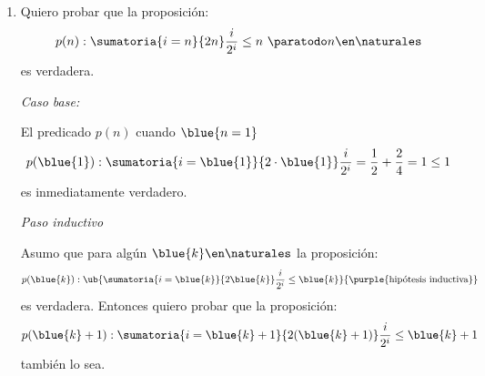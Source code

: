 \begin{enumerate}[label=\magenta{\roman*)}]
        Los terminos de la sumatoria son decrecientes, es decir que \textit{el término más grande de todos es el primero} $\orange{\frac{1}{2}}$,
        cuando $i = 1$, por lo tanto puedo acotar así:
        $$
          \begin{array}{rcl}
            \frac{-2h^2 - 2h + 1}{h + 2} +
            \ob{
              \sumatoria{i=1}{h + 1} \frac{1}{1+i}
            }{
              \leq \orange{\frac{1}{2}} + \cdots + \orange{\frac{1}{2}}
            }
             & \menorIgual{\red{!}} &
            \frac{-2h^2 - 2h + 1}{h + 2} + \sumatoria{i=1}{h + 1} \orange{\frac{1}{2}} \\
             & =                    &
            \frac{-2h^2 - 2h + 1}{h + 2} + \orange{\frac{1}{2}} \cdot (h+1)            \\
             & =                    &
            \frac{1}{2} \cdot \frac{-3h^2 - h + 4}{2h + 4}                             \\
             & \leq                 &
            0 ~ \paratodo h \en \naturales
          \end{array}
        $$

        Juntando todo queda probado el paso inductivo.

        Dado que $p(1), p(h) \ytext p(h + 1)$ son verdaderas, por principio de inducción también lo es $p(n) \paratodo n \en \naturales$


  \item
        Quiero probar que la proposición:
        $$
          p(n): \sumatoria{i = n}{2n} \frac{i}{2^i} \leq n ~ \paratodo n \en \naturales
        $$
        es verdadera.

        \textit{Caso base:}

        El predicado $p(n)$ cuando $\blue{n = 1}$
        $$
          p(\blue{1}) : \sumatoria{i = \blue{1}}{2 \cdot \blue{1}} \frac{i}{2^i} = \frac{1}{2} + \frac{2}{4} = 1 \leq 1
        $$
        es inmediatamente verdadero.

        \medskip

        \textit{Paso inductivo}

        Asumo que para algún $\blue{k} \en \naturales$ la proposición:
        $$
          p(\blue{k}):
          \ub{
            \sumatoria{i = \blue{k}}{2\blue{k}} \frac{i}{2^i} \leq \blue{k}
          }{
            \text{\purple{hipótesis inductiva}}
          }
        $$
        es verdadera. Entonces quiero probar que la proposición:
        $$
          p(\blue{k} + 1): \sumatoria{i = \blue{k} + 1}{2(\blue{k} + 1)} \frac{i}{2^i} \leq \blue{k} + 1
        $$
        también lo sea.


\end{enumerate}

